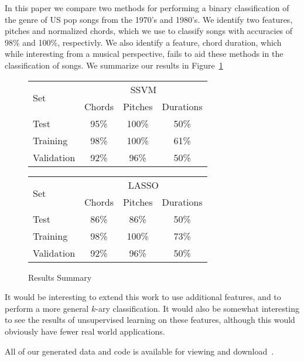 \documentclass[twocolumn,dvipsnames]{article}
\begin{document}
In this paper we compare two methods for performing a binary classification of
the genre of US pop songs from the 1970's and 1980's.
We identify two features,
pitches and normalized chords,
which we use to classify songs with accuracies of 98\% and 100\%, respectivly.
We also identify a feature, chord duration, which while interesting from a
musical perspective, fails to aid these methods in the classification of songs.
We summarize our results in Figure~\ref{tbl:summary}
\begin{figure}[H]
\centering
\begin{tabular}{lccc}
\toprule
    \multirow{2}[2]{*}{\hspace{5mm} Set} & \multicolumn{3}{c}{SSVM} \\
\cmidrule(lr){2-4}
    & Chords & Pitches & Durations \\
\midrule
    Test       &     95\% & 100\% & 50\% \\
    Training   &     98\% & 100\% & 61\% \\
    Validation &     92\% & 96\%  & 50\% \\
\bottomrule
\end{tabular}
\end{figure}

\begin{figure}[H]
\centering
\begin{tabular}{lccc}
\toprule
    \multirow{2}[2]{*}{\hspace{5mm} Set} & \multicolumn{3}{c}{LASSO} \\
\cmidrule(lr){2-4}
    & Chords & Pitches & Durations \\
\midrule
    Test       &     86\% & 86\%  & 50\% \\
    Training   &     98\% & 100\% & 73\% \\
    Validation &     92\% & 96\%  & 50\% \\
\bottomrule
\end{tabular}
\caption{Results Summary}\label{tbl:summary}
\end{figure}

It would be interesting to extend this work to use additional features,
and to perform a more general $k$-ary classification.
It would also be somewhat interesting to see the results of unsupervised
learning on these features, although this would obviously have fewer real
world applications.

All of our generated data and code is available for viewing and download~\cite{Cuspian}.
\end{document}
